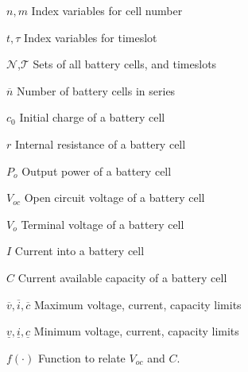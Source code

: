 \documentclass[10pt,twocolumn]{IEEEtran}
\begin{document}
\begin{IEEEdescription}


\item[$n, m$] Index variables for cell number
\item[$t,\tau$] Index variables for timeslot
\item[$ \mathcal{N}$,$\mathcal{T}$] Sets of all battery cells, and timeslots
\item[$\overline{n}$] Number of battery cells in series
\item[$c_0$]  Initial charge of a battery cell
\item[$r$]  Internal resistance of a battery cell
\item[$P_o$]  Output power of a battery cell
\item[$V_{oc}$]  Open circuit voltage of a battery cell
\item[$V_{o}$]  Terminal voltage of a battery cell
\item[$I$]  Current into a battery cell
\item[$C$]  Current available capacity of a battery cell
\item[$\overline{v}, \overline{i}, \overline{c}$] Maximum voltage, current, capacity limits
\item[$\underline{v}, \underline{i}, \underline{c}$] Minimum voltage, current, capacity limits
\item[$f(\cdot)$] Function to relate $V_{oc}$ and $C$. 
\vspace{0.25cm}
\end{IEEEdescription}
\end{document}
